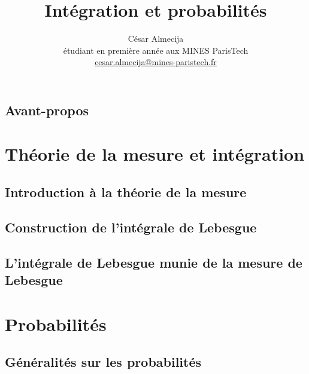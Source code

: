 \documentclass[french]{report}
\theoremstyle{plain}
\theoremstyle{definition}
\theoremstyle{remark}
\begin{document}
\title{Intégration et probabilités}

\author{César Almecija
\\ étudiant en première année aux MINES ParisTech
\\ \href{mailto:cesar.almecija@mines-paristech.fr}{cesar.almecija@mines-paristech.fr}}

\maketitle

\tableofcontents

\chapter*{Avant-propos}



\part{Théorie de la mesure et intégration}

\chapter{Introduction à la théorie de la mesure}



\chapter{Construction de l'intégrale de Lebesgue}



\chapter{L'intégrale de Lebesgue munie de la mesure de Lebesgue}



\part{Probabilités}

\chapter{Généralités sur les probabilités}


\end{document}

